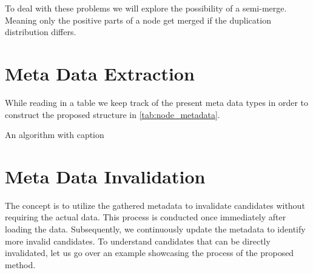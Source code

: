  To deal with these problems we will explore the possibility of a semi-merge. Meaning only the positive parts of a node get merged if the duplication distribution differs.

\section{Meta Data Extraction}\label{sec:meta-data-ext}
While reading in a table we keep track of the present meta data types in order to construct the proposed structure in \ref{tab:node_metadata}.


\begin{algorithm}
\caption{An algorithm with caption}\label{alg:meta-data}
\State {}
\end{algorithm}

\section{Meta Data Invalidation}
The concept is to utilize the gathered metadata to invalidate candidates without requiring the actual data. This process is conducted once immediately after loading the data. Subsequently, we continuously update the metadata to identify more invalid candidates. To understand candidates that can be directly invalidated, let us go over an example showcasing the process of the proposed method. 